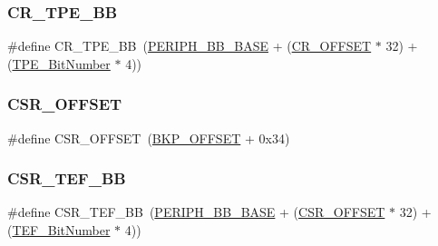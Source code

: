 \mbox{\label{group___b_k_p___private___defines_ga6c11e801c2c1aa87ec2feaefe12bbb96}} 
\subsubsection{\texorpdfstring{CR\_TPE\_BB}{CR\_TPE\_BB}}
{\footnotesize\ttfamily \#define C\+R\+\_\+\+T\+P\+E\+\_\+\+BB~(\mbox{\hyperlink{group___peripheral__memory__map_gaed7efc100877000845c236ccdc9e144a}{P\+E\+R\+I\+P\+H\+\_\+\+B\+B\+\_\+\+B\+A\+SE}} + (\mbox{\hyperlink{group___r_c_c___private___defines_gafa1d3d0ea72132df651c76fc1bdffffc}{C\+R\+\_\+\+O\+F\+F\+S\+ET}} $\ast$ 32) + (\mbox{\hyperlink{group___b_k_p___private___defines_ga8c68be900246b028ff4af93ad119eb98}{T\+P\+E\+\_\+\+Bit\+Number}} $\ast$ 4))}

\mbox{\label{group___b_k_p___private___defines_ga984cbe73312b6d3d355c5053763d499a}} 
\subsubsection{\texorpdfstring{CSR\_OFFSET}{CSR\_OFFSET}}
{\footnotesize\ttfamily \#define C\+S\+R\+\_\+\+O\+F\+F\+S\+ET~(\mbox{\hyperlink{group___b_k_p___private___defines_gaaaf71f474657e7c0c5b0d6ba9697cf5d}{B\+K\+P\+\_\+\+O\+F\+F\+S\+ET}} + 0x34)}

\mbox{\label{group___b_k_p___private___defines_gad60539cc791a26701d414aee529ea203}} 
\subsubsection{\texorpdfstring{CSR\_TEF\_BB}{CSR\_TEF\_BB}}
{\footnotesize\ttfamily \#define C\+S\+R\+\_\+\+T\+E\+F\+\_\+\+BB~(\mbox{\hyperlink{group___peripheral__memory__map_gaed7efc100877000845c236ccdc9e144a}{P\+E\+R\+I\+P\+H\+\_\+\+B\+B\+\_\+\+B\+A\+SE}} + (\mbox{\hyperlink{group___r_c_c___private___defines_ga984cbe73312b6d3d355c5053763d499a}{C\+S\+R\+\_\+\+O\+F\+F\+S\+ET}} $\ast$ 32) + (\mbox{\hyperlink{group___b_k_p___private___defines_gaeb8676e7543d93df60cf7c63fd795672}{T\+E\+F\+\_\+\+Bit\+Number}} $\ast$ 4))}

